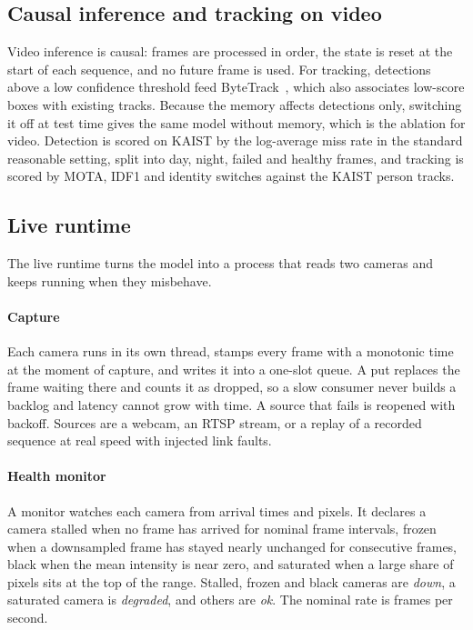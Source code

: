\subsection{Causal inference and tracking on video}
\label{sec:causal}
Video inference is causal: frames are processed in order, the state is reset at the start of each sequence, and no future frame is used. For tracking, detections above a low confidence threshold feed ByteTrack~\cite{zhang2022bytetrack}, which also associates low-score boxes with existing tracks. Because the memory affects detections only, switching it off at test time gives the same model without memory, which is the ablation for video.  Detection is scored on KAIST by the log-average miss rate in the standard reasonable setting, split into day, night, failed and healthy frames, and tracking is scored by MOTA, IDF1 and identity switches against the KAIST person tracks.

\subsection{Live runtime}
\label{sec:live}
The live runtime turns the model into a process that reads two cameras and keeps running when they misbehave.

\paragraph{Capture}
Each camera runs in its own thread, stamps every frame with a monotonic time at the moment of capture, and writes it into a one-slot queue. A put replaces the frame waiting there and counts it as dropped, so a slow consumer never builds a backlog and latency cannot grow with time. A source that fails is reopened with backoff. Sources are a webcam, an RTSP stream, or a replay of a recorded sequence at real speed with injected link faults.

\paragraph{Health monitor}
A monitor watches each camera from arrival times and pixels. It declares a camera stalled when no frame has arrived for \cfgStallIntervals{} nominal frame intervals, frozen when a downsampled frame has stayed nearly unchanged for \cfgFreezeFrames{} consecutive frames, black when the mean intensity is near zero, and saturated when a large share of pixels sits at the top of the range. Stalled, frozen and black cameras are \emph{down}, a saturated camera is \emph{degraded}, and others are \emph{ok}. The nominal rate is \cfgNominalFps{} frames per second.

